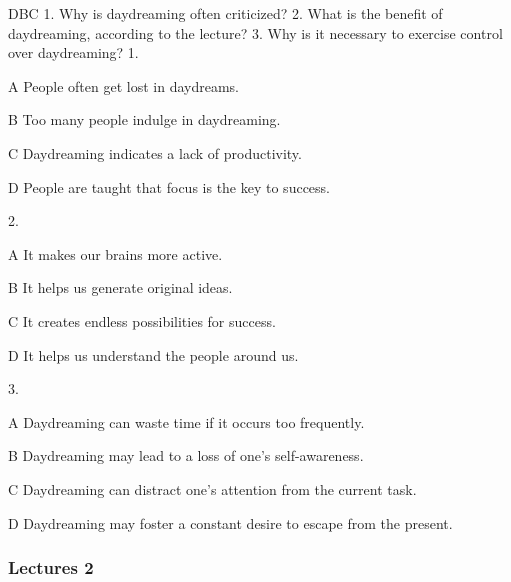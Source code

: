 \begin{enumerate}
	DBC
	1. Why is daydreaming often criticized?
	2. What is the benefit of daydreaming, according to the lecture?
	3. Why is it necessary to exercise control over daydreaming?
	1.
	
	A
	People often get lost in daydreams.
	
	B
	Too many people indulge in daydreaming.
	
	C
	Daydreaming indicates a lack of productivity.
	
	D
	People are taught that focus is the key to success.
	
	2.
	
	A
	It makes our brains more active.
	
	B
	It helps us generate original ideas.
	
	C
	It creates endless possibilities for success.
	
	D
	It helps us understand the people around us.
	
	3.
	
	A
	Daydreaming can waste time if it occurs too frequently.
	
	B
	Daydreaming may lead to a loss of one's self-awareness.
	
	C
	Daydreaming can distract one's attention from the current task.
	
	D
	Daydreaming may foster a constant desire to escape from the present.
\end{enumerate}


\subsubsection{Lectures 2}

